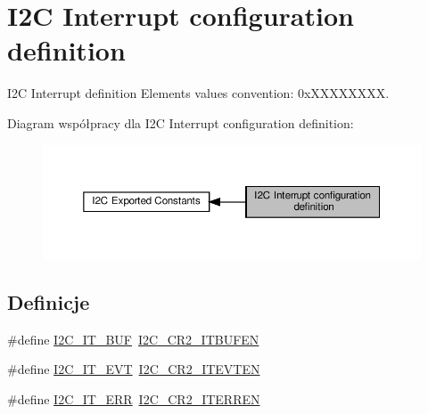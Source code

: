 \hypertarget{group___i2_c___interrupt__configuration__definition}{}\section{I2C Interrupt configuration definition}
\label{group___i2_c___interrupt__configuration__definition}


I2C Interrupt definition Elements values convention\+: 0x\+X\+X\+X\+X\+X\+X\+XX.  


Diagram współpracy dla I2C Interrupt configuration definition\+:\nopagebreak
\begin{figure}[H]
\begin{center}
\leavevmode
\includegraphics[width=350pt]{group___i2_c___interrupt__configuration__definition}
\end{center}
\end{figure}
\subsection*{Definicje}
\begin{DoxyCompactItemize}
\item 
\#define \hyperlink{group___i2_c___interrupt__configuration__definition_gad3ff3f405b882aa4d2f91310aa1cc0df}{I2\+C\+\_\+\+I\+T\+\_\+\+B\+UF}~\hyperlink{group___peripheral___registers___bits___definition_ga2efbe5d96ed0ce447a45a62e8317a68a}{I2\+C\+\_\+\+C\+R2\+\_\+\+I\+T\+B\+U\+F\+EN}
\item 
\#define \hyperlink{group___i2_c___interrupt__configuration__definition_gadd59efa313e1598a084a1e5ec3905b02}{I2\+C\+\_\+\+I\+T\+\_\+\+E\+VT}~\hyperlink{group___peripheral___registers___bits___definition_ga3b1ebaf8173090ec469b055b98e585d2}{I2\+C\+\_\+\+C\+R2\+\_\+\+I\+T\+E\+V\+T\+EN}
\item 
\#define \hyperlink{group___i2_c___interrupt__configuration__definition_gadba3667b439cbf4ba1e6e9aec961ab03}{I2\+C\+\_\+\+I\+T\+\_\+\+E\+RR}~\hyperlink{group___peripheral___registers___bits___definition_ga6f14ae48e4609c2b3645211234cba974}{I2\+C\+\_\+\+C\+R2\+\_\+\+I\+T\+E\+R\+R\+EN}
\end{DoxyCompactItemize}


